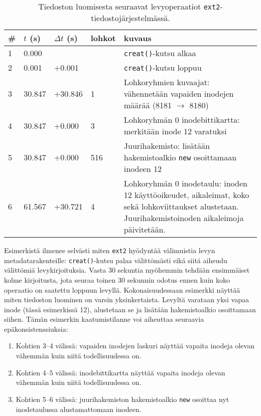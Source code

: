 \begin{table}[H]
\centering
\begin{tabular}{l | l | l | l | p{7cm}}
    \# & $t$ (s) & $\Delta t$ (s) & lohkot & kuvaus \\ \hline \hline
    1  & 0.000    &          &     & \texttt{creat()}-kutsu alkaa   \\ \hline %
    2  & 0.001    & +0.001   &     & \texttt{creat()}-kutsu loppuu  \\ \hline %
    3  & 30.847   & +30.846  & 1   & Lohkoryhmien kuvaajat: vähennetään vapaiden inodejen määrää (8181 $\rightarrow$ 8180)         \\ \hline %
    4  & 30.847   & +0.000   & 3   & Lohkoryhmän 0 inodebittikartta: merkitään inode 12 varatuksi \\ \hline %
    5  & 30.847   & +0.000   & 516 & Juurihakemisto: lisätään hakemistoalkio \texttt{new} osoittamaan inodeen 12                 \\ \hline %
    6  & 61.567   & +30.721  & 4   & Lohkoryhmän 0 inodetaulu: inoden 12 käyttöoikeudet, aikaleimat, koko sekä lohkoviittaukset alustetaan. Juurihakemistoinoden aikaleimoja päivitetään. \\        %
\end{tabular}
\caption{Tiedoston luomisesta seuraavat levyoperaatiot \texttt{ext2}-tiedostojärjestelmässä.}
\label{TabExt2Creation}
\end{table}
%
Esimerkistä ilmenee selvästi miten \texttt{ext2} hyödyntää välimuistia levyn metadatarakenteille: \texttt{creat()}-kutsu palaa välittömästi eikä siitä aiheudu välittömiä levykirjoituksia.
Vasta 30 sekuntia myöhemmin tehdään ensimmäiset kolme kirjoitusta,
jota seuraa toinen 30 sekunnin odotus ennen kuin koko operaatio on saatettu loppuun levyllä.
Kokonaisuudessaan esimerkki näyttää miten tiedoston luominen on varsin yksinkertaista.
Levyltä varataan yksi vapaa inode (tässä esimerkissä 12), alustetaan se ja lisätään hakemistoalkio osoittamaan siihen.
%
Tämän esimerkin kaatumistilanne voi aiheuttaa seuraavia epäkonsistenssiuksia:
\begin{enumerate}
    \item{Kohtien 3--4 välissä: vapaiden inodejen laskuri näyttää vapaita inodeja olevan vähemmän kuin niitä todellisuudessa on.}
    \item{Kohtien 4--5 välissä: inodebittikartta näyttää vapaita inodeja olevan vähemmän kuin niitä todellisuudessa on.}
    \item{Kohtien 5--6 välissä: juurihakemiston hakemistoalkio \texttt{new} osoittaa nyt inodetaulussa alustamattomaan inodeen.}
\end{enumerate}
